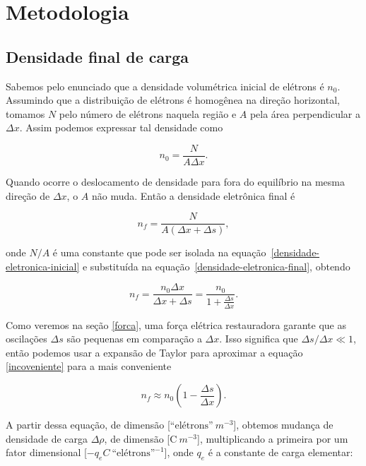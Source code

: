 \documentclass[
	article,
	11pt,
	oneside,
	a4paper,
	english,
	brazil,
	sumario=tradicional
	]{abntex2}
\begin{document}
\section{Metodologia}

\subsection{Densidade final de carga}
Sabemos pelo enunciado que a densidade volumétrica inicial de elétrons é $n_0$. Assumindo que a distribuição de elétrons é homogênea na direção horizontal, tomamos $N$ pelo número de elétrons naquela região e $A$ pela área perpendicular a $\Delta x$. Assim podemos expressar tal densidade como

\begin{equation} \label{densidade-eletronica-inicial}
  n_0 = \frac{N}{A\Delta x}.
\end{equation}

\noindent Quando ocorre o deslocamento de densidade para fora do equilíbrio na mesma direção de $\Delta x$, o $A$ não muda. Então a densidade eletrônica final é

\begin{equation} \label{densidade-eletronica-final}
  n_f = \frac{N}{A(\Delta x + \Delta s)},
\end{equation}

\noindent onde $N/A$ é uma constante que pode ser isolada na equação~\ref{densidade-eletronica-inicial} e substituída na equação~\ref{densidade-eletronica-final}, obtendo

\begin{equation}\label{incoveniente}
  n_f = \frac{n_0\Delta x}{\Delta x + \Delta s} = \frac{n_0}{1 + \frac{\Delta s}{\Delta x}}.
\end{equation}

\noindent Como veremos na seção \ref{forca}, uma força elétrica restauradora garante que as oscilações $\Delta s$ são pequenas em comparação a $\Delta x$. Isso significa que $\Delta s/\Delta x \ll 1$, então podemos usar a expansão de Taylor para aproximar a equação \ref{incoveniente} para a mais conveniente

\begin{equation} \label{densidade-eletronica-taylor}
  n_f \approx n_0(1 - \frac{\Delta s}{\Delta x}).
\end{equation}

\noindent A partir dessa equação, de dimensão [$\textrm{``elétrons''}~m^{-3}$], obtemos mudança de densidade de carga $\Delta\rho$, de dimensão [$\textrm{C}~m^{-3}$], multiplicando a primeira por um fator dimensional [$-q_e C~{\textrm{``elétrons''}^{-1}}$], onde $q_e$ é a constante de carga elementar:
\end{document}
